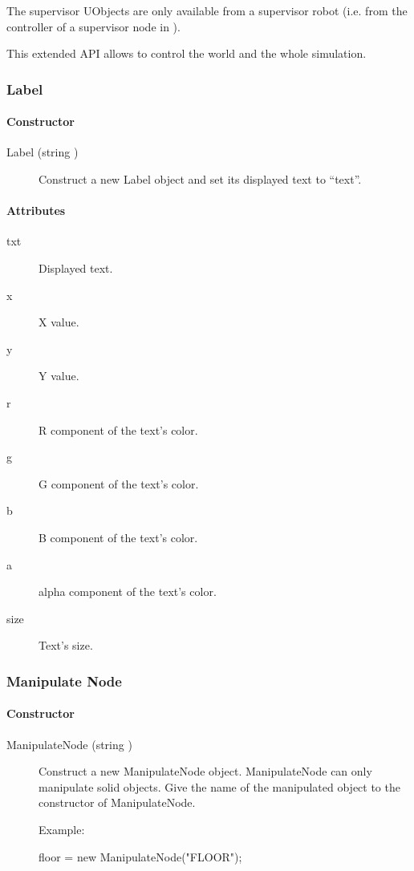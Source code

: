 The supervisor UObjects are only available from a supervisor robot
(i.e. from the controller of a supervisor node in \webots).

This extended API allows \urbi to control the world and the whole
simulation.


\subsubsection{Label}
\paragraph{Constructor}
\noindent
\begin{description}
\item[{Label (string )}] Construct a new Label object and
  set its displayed text to ``text''.
\end{description}

\paragraph{Attributes}

\noindent
\begin{description}
\item[txt] Displayed text.
\item[x] X value.
\item[y] Y value.
\item[r] R component of the text's color.
\item[g] G component of the text's color.
\item[b] B component of the text's color.
\item[a] alpha component of the text's color.
\item[size] Text's size.
\end{description}

\subsubsection{Manipulate Node}

\paragraph{Constructor}

\noindent
\begin{description}
\item[{ManipulateNode (string )}]
  Construct a new ManipulateNode object. ManipulateNode can only
  manipulate solid objects. Give the name of the manipulated object to
  the constructor of ManipulateNode.

Example:

\begin{urbiunchecked}
floor = new ManipulateNode("FLOOR");
\end{urbiunchecked}
\end{description}

